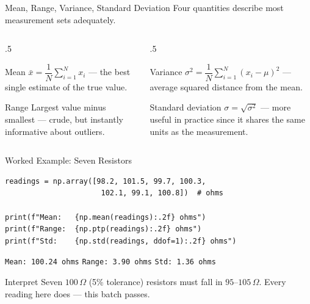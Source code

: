 \documentclass[9pt,aspectratio=169,xcolor=table]{beamer}
\begin{document}
\begin{frame}{Mean, Range, Variance, Standard Deviation}
    \leavevmode
    \small
    Four quantities describe most measurement sets adequately.

    \vspace{2mm}
    \begin{columns}[t]
        \begin{column}{.5\textwidth}
            \begin{block}{Mean}
                \scriptsize $\bar{x} = \dfrac{1}{N}\sum_{i=1}^{N} x_i$
                --- the best single estimate of the true value.
            \end{block}
            \vspace{1mm}
            \begin{block}{Range}
                \scriptsize Largest value minus smallest --- crude, but
                instantly informative about outliers.
            \end{block}
        \end{column}
        \begin{column}{.5\textwidth}
            \begin{block}{Variance}
                \scriptsize $\sigma^2 = \dfrac{1}{N}\sum_{i=1}^{N}(x_i -
                \mu)^2$ --- average squared distance from the mean.
            \end{block}
            \vspace{1mm}
            \begin{block}{Standard deviation}
                \scriptsize $\sigma = \sqrt{\sigma^2}$ --- more useful in
                practice since it shares the \alert{same units} as the
                measurement.
            \end{block}
        \end{column}
    \end{columns}
\end{frame}

\begin{frame}[fragile]{Worked Example: Seven Resistors}
    \leavevmode
\begin{lstlisting}
readings = np.array([98.2, 101.5, 99.7, 100.3,
                      102.1, 99.1, 100.8])  # ohms

print(f"Mean:   {np.mean(readings):.2f} ohms")
print(f"Range:  {np.ptp(readings):.2f} ohms")
print(f"Std:    {np.std(readings, ddof=1):.2f} ohms")
\end{lstlisting}
    \texttt{Mean:   100.24 ohms} \quad
    \texttt{Range:  3.90 ohms} \quad
    \texttt{Std:    1.36 ohms}

    \vspace{2mm}
    \begin{block}{Interpret}
        \small Seven $100\,\Omega$ (5\% tolerance) resistors must fall in
        $95$--$105\,\Omega$. Every reading here does --- this batch
        passes.
    \end{block}
\end{frame}
\end{document}
